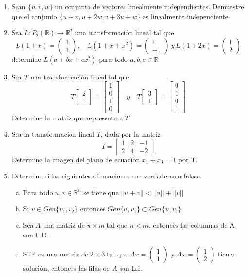 \documentclass[12pt]{article}
\newenvironment{preguntas}
{\begin{enumerate}\itemsep12pt
	}
	{
	\end{enumerate}
}
\newcommand{\ra}{\rightarrow}
\newcommand{\R}{\mathbb{R}}
\begin{document}
\begin{preguntas}
\item Sean $\{u, v, w\}$ un conjunto de vectores linealmente independientes. Demuestre que el conjunto $\{u+v, u+2w, v+3u+w\}$ es linealmente independiente.
\item Sea $L: P_2(\R) \ra \R^2$ una transformación lineal tal que
	$$L(1+x) = \begin{pmatrix}
	1\\
	1
	\end{pmatrix}, \quad L(1+x+x^2) = \begin{pmatrix}
	1\\
	-1
	\end{pmatrix}\ y \ L(1+2x) = \begin{pmatrix}
	1\\
	2
	\end{pmatrix}$$
	determine $L(a+bx+cx^2)$ para todo $a,b,c \in \R$.
\item Sea $T$ una transformación lineal tal que
	$$T\begin{bmatrix}2 \\ 1\end{bmatrix} = \begin{bmatrix}1 \\ 0 \\ 1 \\ 0\end{bmatrix} 
	\quad y \quad
	T \begin{bmatrix}3 \\ 1\end{bmatrix}  =\begin{bmatrix}0 \\ 1 \\ 0 \\ 1\end{bmatrix}$$
	Determine la matriz que representa a $T$
\item Sea la transformación lineal $T$, dada por la matriz
	$$T = \begin{bmatrix}
	1 & 2 & -1\\
	2 & 4 & -2
	\end{bmatrix}$$
	Determine la imagen del plano de ecuación $x_1 + x_3 = 1$ por T.
\item Determine si las siguientes afirmaciones son verdaderas o falsas.
\begin{enumerate}[a)]
\item Para todo $u, v \in \R^n$ se tiene que $||u+v|| < ||u||+||v||$
\item Si $u \in Gen\{v_1, v_2\}$ entonces $Gen\{u, v_1\} \subset Gen\{u, v_2\}$
\item Sea $A$ una matriz de $n \times m$ tal que $n < m $, entonces las columnas de A son L.D.
\item Si $A$ es una matriz de $2 \times 3$ tal que $Ax = \begin{pmatrix}
		1\\
		1
		\end{pmatrix}$ y $ Ax = \begin{pmatrix}
		1\\
		2
		\end{pmatrix}$ tienen solución, entonces las filas de $A$ son L.I.
\end{enumerate}
\end{preguntas}
\end{document}
